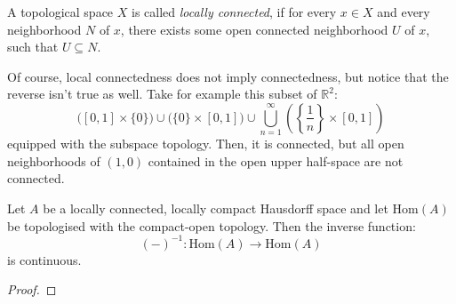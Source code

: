 \begin{definition} A topological space $X$ is called \emph{locally connected}, if for every $x\in X$ and every neighborhood $N$ of $x$, there exists some open connected neighborhood $U$ of $x$, such that $U\subseteq N$.
\end{definition}
\begin{remark} Of course, local connectedness does not imply connectedness, but notice that the reverse isn't true as well. Take for example this subset of $\mathbb{R}^2$: \[\big([0,1]\times\{0\}\big)\cup\big(\{0\}\times[0,1]\big)\cup\bigcup_{n=1}^{\infty}\left(\left\{\frac{1}{n}\right\}\times[0,1]\right)\]
equipped with the subspace topology. Then, it is connected, but all open neighborhoods of $(1,0)$ contained in the open upper half-space are not connected.
\end{remark}

\begin{theorem}\label{thm:inverse} Let $A$ be a locally connected, locally compact Hausdorff space and let $\mathrm{Hom}(A)$ be topologised with the compact-open topology. Then the inverse function:
\[(-)^{-1}:\mathrm{Hom}(A)\to\mathrm{Hom}(A)\]
is continuous.
\end{theorem}
\begin{proof}
\end{proof}
















